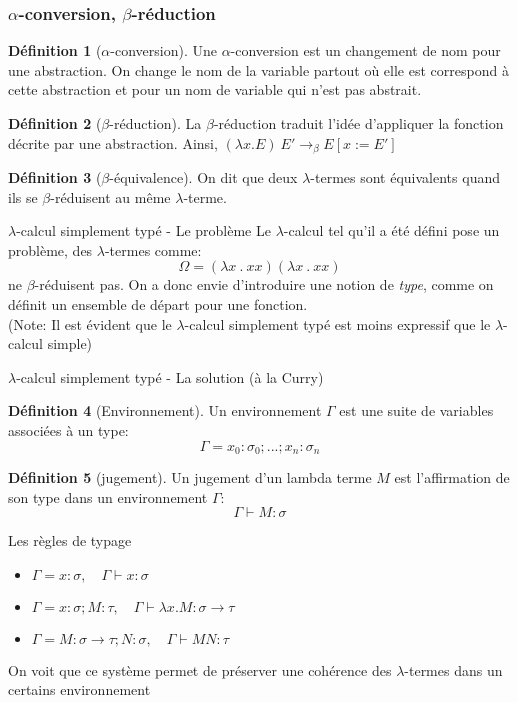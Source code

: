 \documentclass[11pt,a4paper]{beamer}
\theoremstyle{plain}
\theoremstyle{definition}
\newtheorem{defn}{Définition}[section]
\theoremstyle{remark}
\begin{document}
\begin{frame}
\frametitle{$\alpha$-conversion, $\beta$-réduction}
\begin{defn}[$\alpha$-conversion]
Une $\alpha$-conversion est un changement de nom pour une abstraction. On change le nom de la variable partout où elle est correspond à cette abstraction et pour un nom de variable qui n'est pas abstrait.
\end{defn}

\begin{defn}[$\beta$-réduction]
La $\beta$-réduction traduit l'idée d'appliquer la fonction décrite par une abstraction. Ainsi, $(\lambda x.E)~E'\rightarrow_\beta E[x:=E']$ 
\end{defn}

\begin{defn}[$\beta$-équivalence]
On dit que deux $\lambda$-termes sont équivalents quand ils se $\beta$-réduisent au même $\lambda$-terme.
\end{defn}
\end{frame}

\begin{frame}{$\lambda$-calcul simplement typé - Le problème}
Le $\lambda$-calcul tel qu'il a été défini pose un problème, des $\lambda$-termes comme:
$$ \Omega = (\lambda x \ . \ xx) (\lambda x \ . \ xx) $$
ne $\beta$-réduisent pas. On a donc envie d'introduire une notion de \emph{type}, comme on définit un ensemble de départ pour une fonction.
\\
(Note: Il est évident que le $\lambda$-calcul simplement typé est moins expressif que le $\lambda$-calcul simple)
\end{frame}

\begin{frame}{$\lambda$-calcul simplement typé - La solution (à la Curry)}
\begin{defn}[Environnement]
Un environnement $\Gamma$ est une suite de variables associées à un type: $$\Gamma = x_0:\sigma_0;...;x_n:\sigma_n$$
\end{defn}
\begin{defn}[jugement]
Un jugement d'un lambda terme $M$ est l'affirmation de son type dans un environnement $\Gamma$:
$$ \Gamma \vdash M : \sigma $$
\end{defn}
\end{frame}

\begin{frame}{Les règles de typage}
\begin{itemize}
	\item  $ \Gamma = x:\sigma, \quad \Gamma \vdash x : \sigma $
	\item  $ \Gamma = x:\sigma;M:\tau, \quad \Gamma \vdash \lambda x.M : \sigma \to \tau $
	\item  $ \Gamma = M:\sigma \to \tau; N: \sigma, \quad \Gamma \vdash MN : \tau $
\end{itemize}
On voit que ce système permet de préserver une cohérence des $\lambda$-termes dans un certains environnement
\end{frame}
\end{document}
